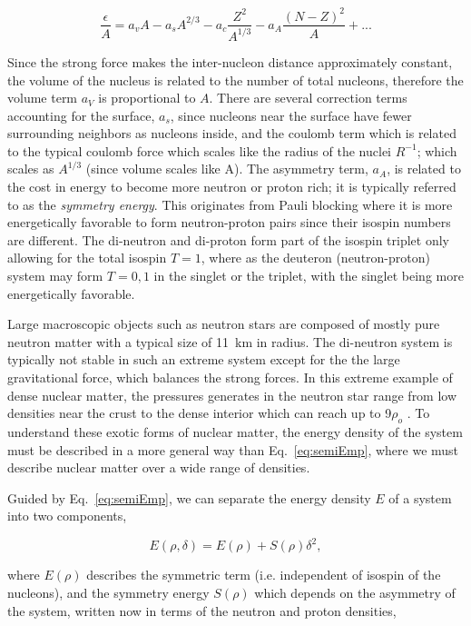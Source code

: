 \begin{equation}
\frac{\epsilon}{A} = a_vA - a_s A^{2/3} - a_c \frac{Z^2}{A^{1/3}} - a_A\frac{(N - Z)^2}{A} + ...
\label{eq:semiEmp}
\end{equation}

Since the strong force makes the inter-nucleon distance approximately constant, the volume of the nucleus is related to the number of total nucleons, therefore the volume term $a_V$ is proportional to $A$. There are several correction terms accounting for the surface, $a_s$, since nucleons near the surface have fewer surrounding neighbors as nucleons inside, and the coulomb term which is related to the typical coulomb force which scales like the radius of the nuclei $R^{-1}$; which scales as $A^{1/3}$ (since volume scales like A). The asymmetry term, $a_A$, is related to the cost in energy to become more neutron or proton rich; it is typically referred to as the \emph{symmetry energy}. This originates from Pauli blocking where it is more energetically favorable to form neutron-proton pairs since their isospin numbers are different. The di-neutron and di-proton form part of the isospin triplet only allowing for the total isospin $T=1$, where as the deuteron (neutron-proton) system may form $T={0,1}$ in the singlet or the triplet, with the singlet being more energetically favorable. 

Large macroscopic objects such as neutron stars are composed of mostly pure neutron matter \cite{neutronstar} with a typical size of \SI{11}{\kilo\metre} in radius. The di-neutron system is typically not stable in such an extreme system except for the the large gravitational force, which balances the strong forces. In this extreme example of dense nuclear matter, the pressures generates in the neutron star range from low densities near the crust to the dense interior which can reach up to 9$\rho_o$ \cite{neutronstar}. To understand these exotic forms of nuclear matter, the energy density of the system must be described in a more general way than Eq.~\ref{eq:semiEmp}, where we must describe nuclear matter over a wide range of densities. 

Guided by Eq.~\ref{eq:semiEmp}, we can separate the energy density $E$ of a system into two components,

\begin{equation}
E(\rho,\delta) = E(\rho	) + S(\rho)\delta^2,
\label{eq:energyEos}
\end{equation}

where $E(\rho)$ describes the symmetric term (i.e. independent of isospin of the nucleons), and the symmetry energy $S(\rho)$ which depends on the asymmetry of the system, written now in terms of the neutron and proton densities, 

